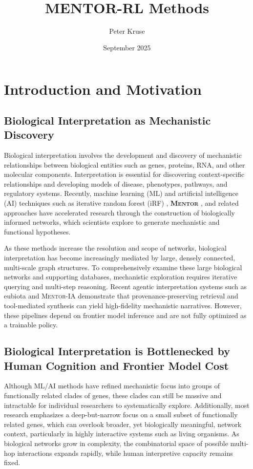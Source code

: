 \documentclass[thesis,letterpaper,12pt]{utthesis}
\title{MENTOR-RL Methods}
\author{Peter Kruse}
\date{September 2025}
\begin{document}
\maketitle

\section{Introduction and Motivation}

\subsection{Biological Interpretation as Mechanistic Discovery}
Biological interpretation involves the development and discovery of mechanistic relationships between biological entities such as genes, proteins, RNA, and other molecular components. Interpretation is essential for discovering context-specific relationships and developing models of disease, phenotypes, pathways, and regulatory systems. Recently, machine learning (ML) and artificial intelligence (AI) techniques such as iterative random forest (iRF) \cite{basu2018iterative, cliff2019high}, \textbf{\textsc{Mentor}} \cite{mentor}, and related approaches have accelerated research through the construction of biologically informed networks, which scientists explore to generate mechanistic and functional hypotheses.

As these methods increase the resolution and scope of networks, biological interpretation has become increasingly mediated by large, densely connected, multi-scale graph structures. To comprehensively examine these large biological networks and supporting databases, mechanistic exploration requires iterative querying and multi-step reasoning. Recent agentic interpretation systems such as eubiota \cite{eubiota} and \textsc{Mentor-IA} \cite{mentor-ia} demonstrate that provenance-preserving retrieval and tool-mediated synthesis can yield high-fidelity mechanistic narratives. However, these pipelines depend on frontier model inference and are not fully optimized as a trainable policy.

\subsection{Biological Interpretation is Bottlenecked by Human Cognition and Frontier Model Cost}
Although ML/AI methods have refined mechanistic focus into groups of functionally related clades of genes, these clades can still be massive and intractable for individual researchers to systematically explore. Additionally, most research emphasizes a deep-but-narrow focus on a small subset of functionally related genes, which can overlook broader, yet biologically meaningful, network context, particularly in highly interactive systems such as living organisms. As biological networks grow in complexity, the combinatorial space of possible multi-hop interactions expands rapidly, while human interpretive capacity remains fixed.
\end{document}

